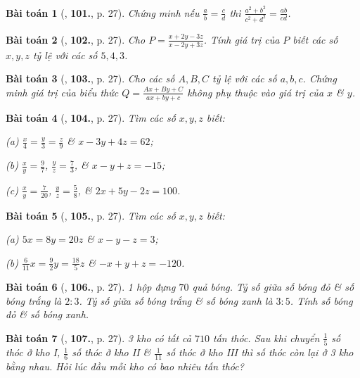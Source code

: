 \documentclass{article}
\numberwithin{equation}{section}
\newtheorem{baitoan}{Bài toán}
\begin{document}
\begin{baitoan}[\cite{Tuyen_Toan_7}, \textbf{101.}, p. 27]
	Chứng minh nếu $\frac{a}{b} = \frac{c}{d}$ thì $\frac{a^2 + b^2}{c^2 + d^2} = \frac{ab}{cd}$.
\end{baitoan}

\begin{baitoan}[\cite{Tuyen_Toan_7}, \textbf{102.}, p. 27]
	Cho $P = \frac{x + 2y - 3z}{x - 2y + 3z}$. Tính giá trị của $P$ biết các số $x,y,z$ tỷ lệ với các số $5,4,3$.
\end{baitoan}

\begin{baitoan}[\cite{Tuyen_Toan_7}, \textbf{103.}, p. 27]
	Cho các số $A,B,C$ tỷ lệ với các số $a,b,c$. Chứng minh giá trị của biểu thức $Q = \frac{Ax + By + C}{ax + by + c}$ không phụ thuộc vào giá trị của $x$ \& $y$.
\end{baitoan}

\begin{baitoan}[\cite{Tuyen_Toan_7}, \textbf{104.}, p. 27]
	Tìm các số $x,y,z$ biết:
	\begin{enumerate*}
		\item[(a)] $\frac{x}{4} = \frac{y}{3} = \frac{z}{9}$ \& $x - 3y + 4z = 62$;
		\item[(b)] $\frac{x}{y} = \frac{9}{7}$, $\frac{y}{z} = \frac{7}{3}$, \& $x - y + z = -15$;
		\item[(c)] $\frac{x}{y} = \frac{7}{20}$, $\frac{y}{z} = \frac{5}{8}$, \& $2x + 5y - 2z = 100$.
	\end{enumerate*}
\end{baitoan}

\begin{baitoan}[\cite{Tuyen_Toan_7}, \textbf{105.}, p. 27]
	Tìm các số $x,y,z$ biết:
	\begin{enumerate*}
		\item[(a)] $5x = 8y = 20z$ \& $x - y - z = 3$;
		\item[(b)] $\frac{6}{11}x = \frac{9}{2}y = \frac{18}{5}z$ \& $-x + y + z = -120$.
	\end{enumerate*}
\end{baitoan}

\begin{baitoan}[\cite{Tuyen_Toan_7}, \textbf{106.}, p. 27]
	1 hộp đựng $70$ quả bóng. Tỷ số giữa số bóng đỏ \& số bóng trắng là $2:3$. Tỷ số giữa số bóng trắng \& số bóng xanh là $3:5$. Tính số bóng đỏ \& số bóng xanh.
\end{baitoan}

\begin{baitoan}[\cite{Tuyen_Toan_7}, \textbf{107.}, p. 27]
	3 kho có tất cả $710$ tấn thóc. Sau khi chuyển $\frac{1}{5}$ số thóc ở kho I, $\frac{1}{6}$ số thóc ở kho II \& $\frac{1}{11}$ số thóc ở kho III thì số thóc còn lại ở 3 kho bằng nhau. Hỏi lúc đầu mỗi kho có bao nhiêu tấn thóc?
\end{baitoan}
\end{document}
